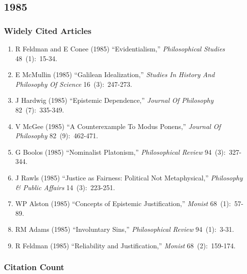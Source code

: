 \documentclass[
  10pt,
  letterpaper,
  DIV=11,
  numbers=noendperiod,
  twoside]{scrartcl}
\providecommand{\tightlist}{%
  \setlength{\itemsep}{0pt}\setlength{\parskip}{0pt}}\usepackage{longtable,booktabs,array}
\begin{document}
\newpage

\subsection{1985}\label{sec-s1985}

\subsubsection*{Widely Cited Articles}\label{widely-cited-articles-29}

\begin{enumerate}
\def\labelenumi{\arabic{enumi}.}
\tightlist
\item
  R Feldman and E Conee (1985) ``Evidentialism,'' \emph{Philosophical
  Studies} 48~(1):~15-34.
\item
  E McMullin (1985) ``Galilean Idealization,'' \emph{Studies In History
  And Philosophy Of Science} 16~(3):~247-273.
\item
  J Hardwig (1985) ``Epistemic Dependence,'' \emph{Journal Of
  Philosophy} 82~(7):~335-349.
\item
  V McGee (1985) ``A Counterexample To Modus Ponens,'' \emph{Journal Of
  Philosophy} 82~(9):~462-471.
\item
  G Boolos (1985) ``Nominalist Platonism,'' \emph{Philosophical Review}
  94~(3):~327-344.
\item
  J Rawls (1985) ``Justice as Fairness: Political Not Metaphysical,''
  \emph{Philosophy \& Public Affairs} 14~(3):~223-251.
\item
  WP Alston (1985) ``Concepts of Epistemic Justification,''
  \emph{Monist} 68~(1):~57-89.
\item
  RM Adams (1985) ``Involuntary Sins,'' \emph{Philosophical Review}
  94~(1):~3-31.
\item
  R Feldman (1985) ``Reliability and Justification,'' \emph{Monist}
  68~(2):~159-174.
\end{enumerate}

\subsubsection*{Citation Count}\label{sec-count-1985}
\end{document}
